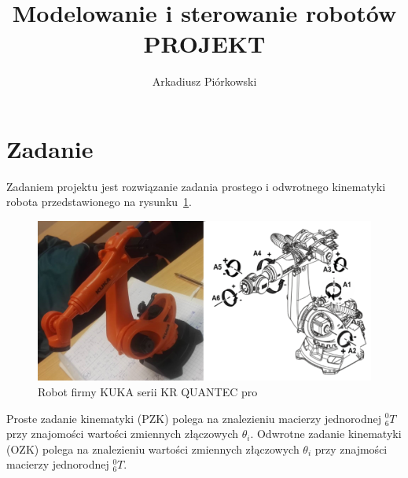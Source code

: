 \documentclass{article}
\title{Modelowanie i sterowanie robotów\\ PROJEKT}
\author{Arkadiusz Piórkowski}
\begin{document}
\maketitle


\section{Zadanie}

Zadaniem projektu jest rozwiązanie zadania prostego i odwrotnego kinematyki robota przedstawionego na rysunku~\ref{fig::robot}.
\begin{figure}[H]
	\centering
	\includegraphics[width=\textwidth]{robot_KUKA_KR_QUANTECpro.png}
	\caption{Robot firmy KUKA serii KR QUANTEC pro}
	\label{fig::robot}
\end{figure}

Proste zadanie kinematyki (PZK) polega na znalezieniu macierzy jednorodnej $ ^0_6 T$ przy znajomo\'sci warto\'sci zmiennych złączowych $\theta_i$.
\newline
Odwrotne zadanie kinematyki (OZK) polega na znalezieniu warto\'sci zmiennych złączowych $\theta_i$ przy znajmo\'sci macierzy jednorodnej  $^0_6 T$.
\end{document}
